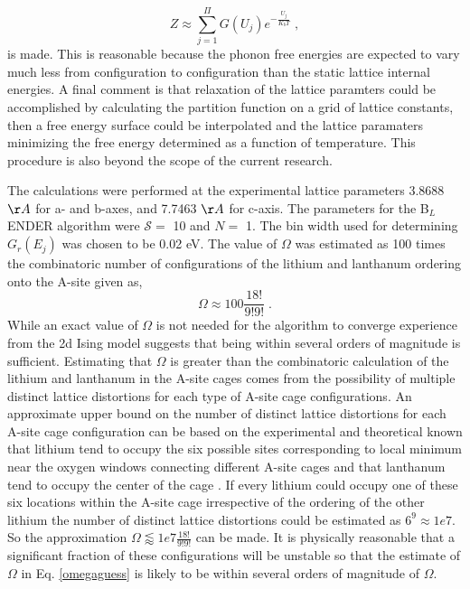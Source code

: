 \documentclass[aps,pre,reprint,superscriptaddress,showkeys]{revtex4-1}
\begin{document}
 \begin{equation}
 Z\approx \sum_{j=1}^{\Pi}G(U_j)e^{-\frac{U_j}{K_bT}}\;,
 \end{equation}
 is made. This is reasonable because the phonon free energies are expected to vary much less from configuration to configuration than the static lattice internal energies. A final comment is that relaxation of the lattice paramters could be accomplished by calculating the partition function on a grid of lattice constants, then a free energy surface could be interpolated and the lattice paramaters minimizing the free energy determined as a function of temperature. This procedure is also beyond the scope of the current research. 
 
  The calculations were performed at the experimental lattice parameters 3.8688 $\AA$ for a- and b-axes, and 7.7463 $\AA$ for c-axis. The parameters for the B$_L$ENDER algorithm were $\mathcal{S}=$ 10 and $N=$ 1. The bin width used for determining $G_r(E_j)$ was chosen to be 0.02 eV. The value of $\Omega$ was estimated as 100 times the combinatoric number of configurations of the lithium and lanthanum ordering onto the A-site  given as, 
\begin{equation}
\Omega \approx 100\frac{18!}{9!9!} \;.
\label{omegaguess}
\end{equation}
While an exact value of $\Omega$ is not needed for the algorithm to converge experience from the 2d Ising model suggests that being within several orders of magnitude is sufficient. Estimating that $\Omega$ is greater than the combinatoric calculation of the lithium and lanthanum in the A-site cages comes from the possibility of multiple distinct lattice distortions for each type of A-site cage configurations. An approximate upper bound on the number of distinct lattice distortions for each A-site cage configuration can be based on the experimental and theoretical known that lithium tend to occupy the six possible sites corresponding to local minimum near the oxygen windows connecting different  A-site cages and that lanthanum tend to occupy the center of the cage \cite{Asitedistribution,imaginary_phonons,Li_La_ordering_computational,lithiumpos}. If every lithium could occupy one of these six locations within the A-site cage irrespective of the ordering of the other lithium the number of distinct lattice distortions could be estimated as $6^{9}\approx 1e7$. So the approximation $\Omega  \lessapprox 1e7  \frac{18!}{9!9!}$ can be made. It is physically reasonable that a significant fraction of these configurations will be unstable so that the estimate of $\Omega$ in Eq. \ref{omegaguess} is likely to be within several orders of magnitude of  $\Omega$. 
\end{document}
